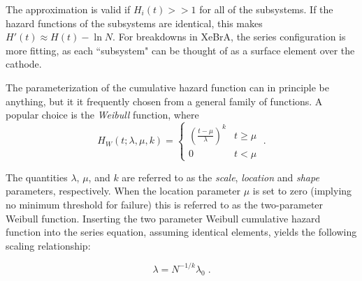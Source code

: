 The approximation is valid if $H_i(t)>>1$ for all of the subsystems.
If the hazard functions of the subsystems are identical, this makes $H'(t) \approx H(t) - \ln N$.
For breakdowns in XeBrA, the series configuration is more fitting, as each ``subsystem" can be thought of as a surface element over the cathode.

The parameterization of the cumulative hazard function can in principle be anything, but it it frequently chosen from a general family of functions.
A popular choice is the \textit{Weibull} function, where 
\begin{equation}
    H_W(t;\lambda, \mu, k) =
    \begin{cases}
    (\frac{t-\mu}{\lambda})^k & t\geq \mu\\
    0 & t < \mu
    \end{cases}\;.
\end{equation}

The quantities $\lambda$, $\mu$, and $k$ are referred to as the \textit{scale}, \textit{location} and \textit{shape} parameters, respectively.
When the location parameter $\mu$ is set to zero (implying no minimum threshold for failure) this is referred to as the two-parameter Weibull function.
Inserting the two parameter Weibull cumulative hazard function into the series equation, assuming identical elements, yields the following scaling relationship:

\begin{equation}
    \lambda = N^{-1/k}\lambda_0\;.
    \label{eq:weibull_area_scaling}
\end{equation}

